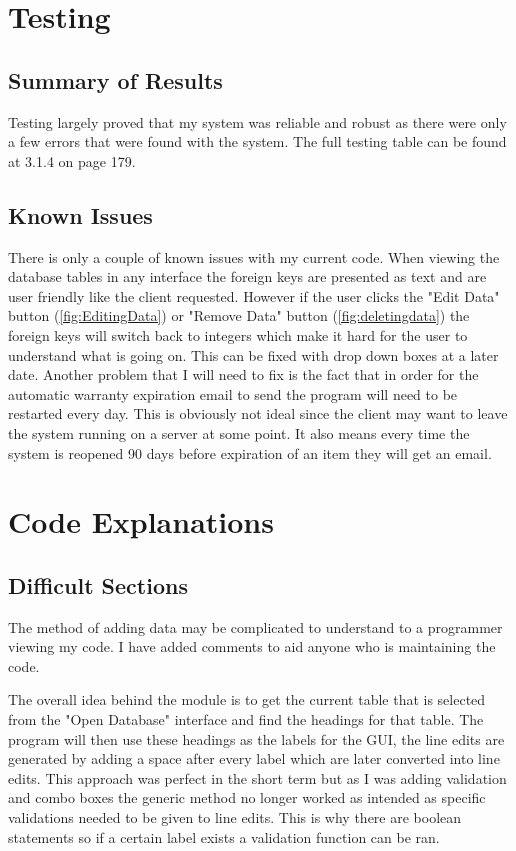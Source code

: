\section{Testing}

\subsection{Summary of Results}

Testing largely proved that my system was reliable and robust as there were only a few errors that were found with the system. The full testing table can be found at 3.1.4 on page 179.

\subsection{Known Issues}

There is only a couple of known issues with my current code. When viewing the database tables in any interface the foreign keys are presented as text and are user friendly like the client requested. However if the user clicks the "Edit Data" button (\ref{fig:EditingData}) or "Remove Data" button (\ref{fig:deletingdata}) the foreign keys will switch back to integers which make it hard for the user to understand what is going on. This can be fixed with drop down boxes at a later date. Another problem that I will need to fix is the fact that in order for the automatic warranty expiration email to send the program will need to be restarted every day. This is obviously not ideal since the client may want to leave the system running on a server at some point. It also means every time the system is reopened 90 days before expiration of an item they will get an email.

\section{Code Explanations}

\subsection{Difficult Sections}

The method of adding data may be complicated to understand to a programmer viewing my code. I have added comments to aid anyone who is maintaining the code.

The overall idea behind the module is to get the current table that is selected from the  "Open Database" interface and find the headings for that table. The program will then use these headings as the labels for the GUI, the line edits are generated by adding a space after every label which are later converted into line edits. This approach was perfect in the short term but as I was adding validation and combo boxes the generic method no longer worked as intended as specific validations needed to be given to line edits. This is why there are boolean statements so if a certain label exists a validation function can be ran.

